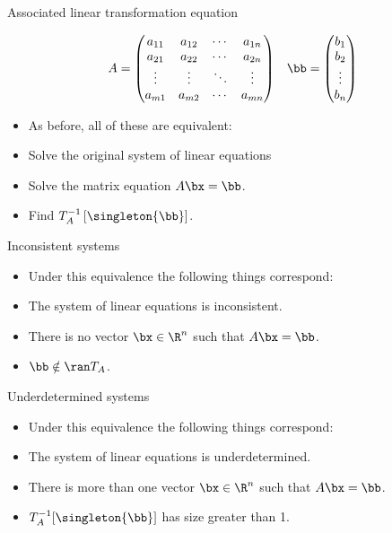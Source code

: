 \documentclass{beamer}
\begin{document}
\begin{frame}{Associated linear transformation equation}


$$
\begin{matrix}
A =
\begin{pmatrix}
a_{11} & a_{12} & \cdots & a_{1n} \\
a_{21} & a_{22} & \cdots & a_{2n} \\
\vdots & \vdots & \ddots & \vdots \\
a_{m1} & a_{m2} & \cdots & a_{mn}
\end{pmatrix}
&
\bb =
\begin{pmatrix}
b_1 \\ b_2 \\ \vdots \\ b_n
\end{pmatrix}
\end{matrix}
$$

\begin{itemize}
\item As before, all of these are equivalent:
\item Solve the original system of linear equations
\item Solve the matrix equation $A\bx=\bb$.
\item Find $T_A^{-1} \left[ \singleton{\bb}\right]$.
\end{itemize}


\end{frame}



\begin{frame}{Inconsistent systems}

\begin{itemize}
\item Under this equivalence the following things correspond:
\item The system of linear equations is inconsistent.
\item There is no vector $\bx \in \R^n$ such that $A \bx = \bb$.
\item $\bb \notin \ran T_A$.
\end{itemize}

\end{frame}


\begin{frame}{Underdetermined systems}

\begin{itemize}
\item Under this equivalence the following things correspond:
\item The system of linear equations is underdetermined.
\item There is more than one vector $\bx \in \R^n$ such that $A \bx = \bb$.
\item $T_A^{-1}[\singleton{\bb}]$ has size greater than 1.
\end{itemize}

\end{frame}
\end{document}
